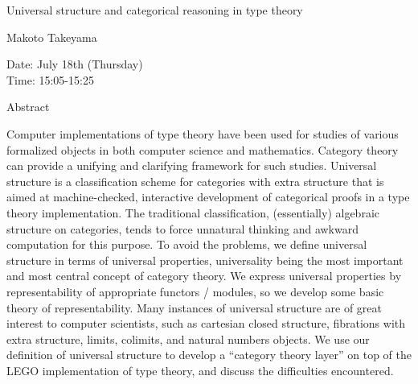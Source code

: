 \begin{center}
\LARGE
Universal structure and categorical reasoning in type theory

\end{center}

\begin{center}
\Large
Makoto Takeyama

\end{center}

\noindent
Date:  July 18th (Thursday)\\
Time:  15:05-15:25\\

\begin{center}
\large
Abstract
\end{center}

Computer implementations of type theory have been used for studies of various formalized objects
in both computer science and mathematics. Category theory can provide a unifying and clarifying
framework for such studies. Universal structure is a classification scheme for categories with extra
structure that is aimed at machine-checked, interactive development of categorical proofs in a type
theory implementation. The traditional classification, (essentially) algebraic structure on
categories, tends to force unnatural thinking and awkward computation for this purpose. To avoid
the problems, we define universal structure in terms of universal properties, universality being the
most important and most central concept of category theory. We express universal properties by
representability of appropriate functors / modules, so we develop some basic theory of
representability. Many instances of universal structure are of great interest to computer scientists,
such as cartesian closed structure, fibrations with extra structure, limits, colimits, and natural
numbers objects. We use our definition of universal structure to develop a ``category theory layer''
on top of the LEGO implementation of type theory, and discuss the difficulties encountered. 

